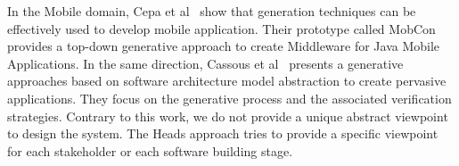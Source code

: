 In the Mobile domain, Cepa et al~\cite{1385821} show that generation techniques can be effectively used to develop mobile application. Their prototype called MobCon provides a top-down generative approach to create Middleware for Java Mobile Applications. In the same direction, Cassous et al~\cite{Cassou:2011:LSA:1985793.1985852} presents a generative approaches based on software architecture model abstraction to create pervasive applications. They focus on the generative process and the associated verification strategies. Contrary to this work, we do not provide a unique abstract viewpoint to design the system. The Heads approach tries to provide a specific viewpoint for each stakeholder or each software building stage.
